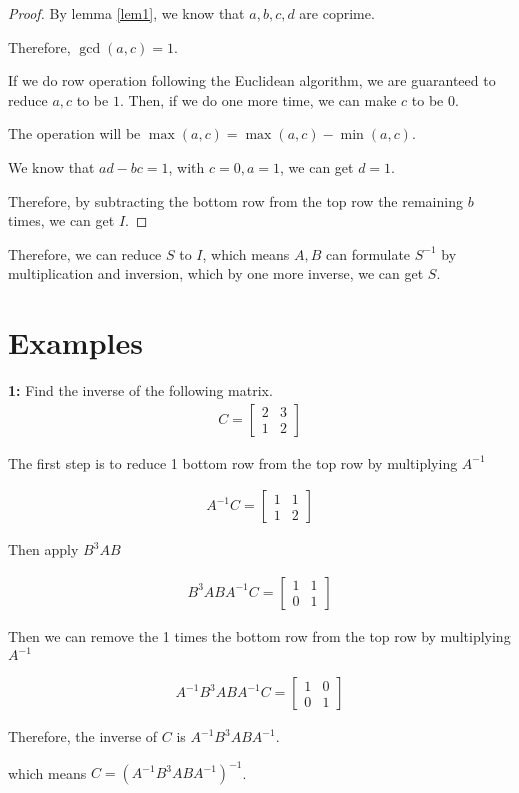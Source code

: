 \documentclass[11pt]{article}
\newenvironment{exercise}[1]
	{\noindent \textbf{#1:}}
	{\par \vspace{0.5\baselineskip}}
\begin{document}
\begin{proof}
	By lemma \ref{lem1}, we know that $a,b,c,d$ are coprime.

	Therefore, $\operatorname{gcd}(a,c)=1$.

	If we do row operation following the Euclidean algorithm,
	we are guaranteed to reduce $a,c$ to be $1$.
	Then, if we do one more time, we can make $c$ to be $0$.

	The operation will be \(\max(a,c)=\max(a,c)-\min(a,c)\).

	We know that $ad-bc=1$, with $c=0, a=1$, we can get $d=1$.

	Therefore, by subtracting the bottom row from the top row the remaining $b$ times,
	we can get $I$.
\end{proof}


Therefore, we can reduce $S$ to $I$, which means $A,B$ can 
	formulate $S^{-1}$ by multiplication and inversion, 
	which by one more inverse, we can get $S$.

\section*{Examples}

\begin{exercise}{1}
	Find the inverse of the following matrix.
	\begin{align*}
		C = \begin{bmatrix}
			    2 & 3 \\
			    1 & 2
		    \end{bmatrix}
	\end{align*}

	The first step is to reduce 1 bottom row from the top row by multiplying \(A^{-1}\)
	
	\begin{align*}
		A^{-1}C = \begin{bmatrix}
			    1 & 1 \\
			    1 & 2
		    \end{bmatrix}
	\end{align*}

	Then apply \(B^{3}AB\)

	\begin{align*}
		B^{3}ABA^{-1}C = \begin{bmatrix}
			    1 & 1 \\
			    0 & 1
		    \end{bmatrix}
	\end{align*}

	Then we can remove the 1 times the bottom row from the top row by multiplying \(A^{-1}\)

	\begin{align*}
		A^{-1}B^{3}ABA^{-1}C = \begin{bmatrix}
			    1 & 0 \\
			    0 & 1
		    \end{bmatrix}
	\end{align*}

	Therefore, the inverse of $C$ is $A^{-1}B^{3}ABA^{-1}$.

	which means \(C=(A^{-1}B^{3}ABA^{-1})^{-1}\).

\end{exercise}
\end{document}
